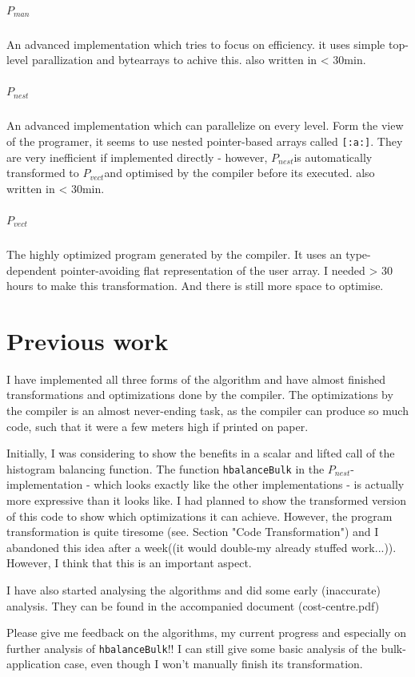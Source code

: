 \documentclass{article}
\newcommand{\man}[0]{$P_{man}$}
\newcommand{\ndpn}[0]{$P_{nest}$}
\newcommand{\ndpv}[0]{$P_{vect}$}
\newcommand{\note}[1]{{\tiny (#1)}}
\begin{document}
    \subparagraph{\man}
        An advanced implementation which tries to focus on efficiency.
        it uses simple top-level parallization and bytearrays to achive this.
        also written in < 30min.
        
     \subparagraph{\ndpn}
        An advanced implementation which can parallelize on every level.
        Form the view of the programer, it seems to use nested pointer-based arrays
        called \texttt{[:a:]}. They are very inefficient if implemented directly
        - however, \ndpn is automatically transformed to \ndpv and optimised by the compiler before its executed.
        also written in < 30min.
        
     \subparagraph{\ndpv}
        The highly optimized program generated by the compiler.
        It uses an type-dependent pointer-avoiding flat representation
        of the user array. I needed > 30 hours to make this transformation.
        And there is still more space to optimise.
      
  \section{Previous work}
    I have implemented all three forms of the algorithm and have almost
    finished transformations and optimizations done by the compiler.
    The optimizations by the compiler is an almost never-ending task,
    as the compiler can produce so much code, such that it were
    a few meters high if printed on paper.
    
    Initially, I was considering to show the benefits in a scalar and
    lifted call of the histogram balancing function. The function
    \texttt{hbalanceBulk} in the \ndpn-implementation - which looks exactly like
    the other implementations - is actually more expressive than it looks like.
    I had planned to show the transformed version of this code to show which optimizations it can achieve.
    However, the program transformation is quite tiresome (see. Section "Code Transformation") and
    I abandoned this idea after a week(\note{it would double-my already stuffed work...}). However, I think that this is an important aspect.
    
    I have also started analysing the algorithms and did some early (inaccurate) analysis.
    They can be found in the accompanied document \note{cost-centre.pdf}
    
    Please give me feedback on the algorithms, my current progress and especially on further analysis of \texttt{hbalanceBulk}!!
    I can still give some basic analysis of the bulk-application case, even though I won't manually
    finish its transformation.
    
\end{document}
